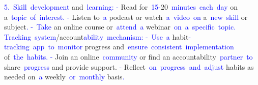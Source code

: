 \documentclass{article}
\begin{document}
\begin{tcolorbox}[colframe=black,colback=white]
\textcolor{blue}{5}\textcolor{blue}{.}\textcolor{blue}{~Skill}\textcolor{blue}{~development} and\textcolor{blue}{~learning}\textcolor{blue}{:
}\textcolor{blue}{-} Read for\textcolor{blue}{~}\textcolor{blue}{15}\textcolor{blue}{-}20\textcolor{blue}{~minutes}\textcolor{blue}{~each}\textcolor{blue}{~day} on a\textcolor{blue}{~topic}\textcolor{blue}{~of}\textcolor{blue}{~interest}\textcolor{blue}{.
}\textcolor{blue}{-} Listen to\textcolor{blue}{~a} podcast or watch\textcolor{blue}{~a}\textcolor{blue}{~video}\textcolor{blue}{~on} a\textcolor{blue}{~new}\textcolor{blue}{~skill} or subject\textcolor{blue}{.
}\textcolor{blue}{-}\textcolor{blue}{~Take} an online course or\textcolor{blue}{~attend}\textcolor{blue}{~a} webinar\textcolor{blue}{~on}\textcolor{blue}{~a}\textcolor{blue}{~specific}\textcolor{blue}{~topic}\textcolor{blue}{.
}\textcolor{blue}{Tracking}\textcolor{blue}{~system}/account\textcolor{blue}{ability}\textcolor{blue}{~mechanism}\textcolor{blue}{:
}\textcolor{blue}{-}\textcolor{blue}{~Use}\textcolor{blue}{~a} habit\textcolor{blue}{-tracking}\textcolor{blue}{~app}\textcolor{blue}{~to}\textcolor{blue}{~monitor} progress and\textcolor{blue}{~ensure}\textcolor{blue}{~consistent}\textcolor{blue}{~implementation} of\textcolor{blue}{~the}\textcolor{blue}{~habits}\textcolor{blue}{.
}\textcolor{blue}{-} Join an online\textcolor{blue}{~community} or find an accountability\textcolor{blue}{~partner}\textcolor{blue}{~to} share\textcolor{blue}{~progress} and provide support.
\textcolor{blue}{-} Reflect\textcolor{blue}{~on}\textcolor{blue}{~progress}\textcolor{blue}{~and}\textcolor{blue}{~adjust} habits as needed on\textcolor{blue}{~a} weekly\textcolor{blue}{~or}\textcolor{blue}{~monthly} basis\textcolor{blue}{.}\textcolor{blue}{}
\end{tcolorbox}
\end{document}
